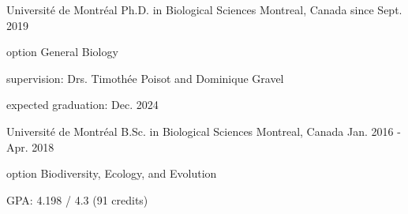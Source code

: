 
\begin{cventries}

  \cventry
    {Université de Montréal} %
    {Ph.D. in Biological Sciences} %
    {Montreal, Canada} %
    {since Sept. 2019} %
    {
      \begin{cvitems} %
        \item {option General Biology}
        \item {supervision: Drs. Timothée Poisot and Dominique Gravel}
        \item {expected graduation: Dec. 2024}
      \end{cvitems}
    }

\end{cventries}

\begin{cventries}

  \cventry
    {Université de Montréal} %
    {B.Sc. in Biological Sciences} %
    {Montreal, Canada} %
    {Jan. 2016 - Apr. 2018} %
    {
      \begin{cvitems} %
        \item {option Biodiversity, Ecology, and Evolution}
        \item {GPA: 4.198 / 4.3 (91 credits)}
      \end{cvitems}
    }

\end{cventries}



